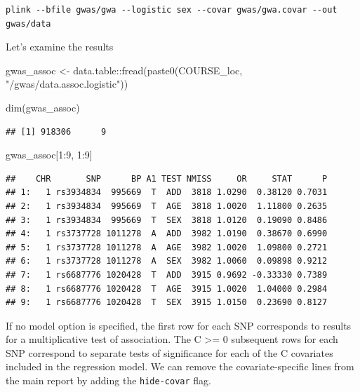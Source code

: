 \documentclass[
]{book}
\newenvironment{Shaded}{\begin{snugshade}}{\end{snugshade}}
\newcommand{\DecValTok}[1]{\textcolor[rgb]{0.00,0.00,0.81}{#1}}
\newcommand{\FunctionTok}[1]{\textcolor[rgb]{0.00,0.00,0.00}{#1}}
\newcommand{\NormalTok}[1]{#1}
\newcommand{\OtherTok}[1]{\textcolor[rgb]{0.56,0.35,0.01}{#1}}
\newcommand{\SpecialCharTok}[1]{\textcolor[rgb]{0.00,0.00,0.00}{#1}}
\newcommand{\StringTok}[1]{\textcolor[rgb]{0.31,0.60,0.02}{#1}}
\begin{document}
\begin{verbatim}
plink --bfile gwas/gwa --logistic sex --covar gwas/gwa.covar --out gwas/data
\end{verbatim}

Let's examine the results

\begin{Shaded}
\begin{Highlighting}[]
\NormalTok{gwas\_assoc }\OtherTok{\textless{}{-}}\NormalTok{ data.table}\SpecialCharTok{::}\FunctionTok{fread}\NormalTok{(}\FunctionTok{paste0}\NormalTok{(COURSE\_loc, }\StringTok{"/gwas/data.assoc.logistic"}\NormalTok{))}

\FunctionTok{dim}\NormalTok{(gwas\_assoc)}
\end{Highlighting}
\end{Shaded}

\begin{verbatim}
## [1] 918306      9
\end{verbatim}

\begin{Shaded}
\begin{Highlighting}[]
\NormalTok{gwas\_assoc[}\DecValTok{1}\SpecialCharTok{:}\DecValTok{9}\NormalTok{, }\DecValTok{1}\SpecialCharTok{:}\DecValTok{9}\NormalTok{]}
\end{Highlighting}
\end{Shaded}

\begin{verbatim}
##    CHR       SNP      BP A1 TEST NMISS     OR     STAT      P
## 1:   1 rs3934834  995669  T  ADD  3818 1.0290  0.38120 0.7031
## 2:   1 rs3934834  995669  T  AGE  3818 1.0020  1.11800 0.2635
## 3:   1 rs3934834  995669  T  SEX  3818 1.0120  0.19090 0.8486
## 4:   1 rs3737728 1011278  A  ADD  3982 1.0190  0.38670 0.6990
## 5:   1 rs3737728 1011278  A  AGE  3982 1.0020  1.09800 0.2721
## 6:   1 rs3737728 1011278  A  SEX  3982 1.0060  0.09898 0.9212
## 7:   1 rs6687776 1020428  T  ADD  3915 0.9692 -0.33330 0.7389
## 8:   1 rs6687776 1020428  T  AGE  3915 1.0020  1.04000 0.2984
## 9:   1 rs6687776 1020428  T  SEX  3915 1.0150  0.23690 0.8127
\end{verbatim}

If no model option is specified, the first row for each SNP corresponds to results for a multiplicative test of association. The C \textgreater= 0 subsequent rows for each SNP correspond to separate tests of significance for each of the C covariates included in the regression model. We can remove the covariate-specific lines from the main report by adding the \texttt{hide-covar} flag.
\end{document}
